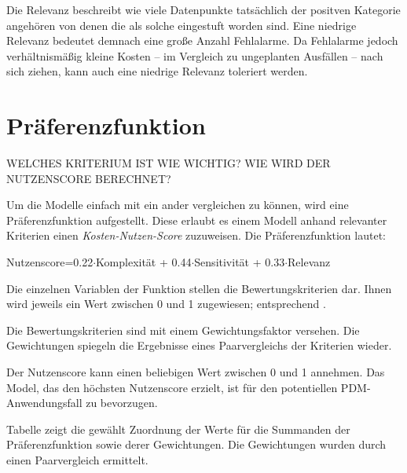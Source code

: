 Die Relevanz beschreibt wie viele Datenpunkte tatsächlich der positven Kategorie angehören von denen die als solche eingestuft worden sind. Eine niedrige Relevanz bedeutet demnach eine große Anzahl Fehlalarme. Da Fehlalarme jedoch verhältnismäßig kleine Kosten -- im Vergleich zu ungeplanten Ausfällen -- nach sich ziehen, kann auch eine niedrige Relevanz toleriert werden.


\section{Präferenzfunktion}
\label{sec:praeferenzfunktion}
WELCHES KRITERIUM IST WIE WICHTIG? WIE WIRD DER NUTZENSCORE BERECHNET?

Um die Modelle einfach mit ein ander vergleichen zu können, wird eine Präferenzfunktion aufgestellt. Diese erlaubt es einem Modell anhand relevanter Kriterien einen \textit{Kosten-Nutzen-Score} zuzuweisen. Die Präferenzfunktion lautet:
\begin{center}
    Nutzenscore=\num{0,22}$\cdot$Komplexität + \num{0,44}$\cdot$Sensitivität + \num{0,33}$\cdot$Relevanz
\end{center}

Die einzelnen Variablen der Funktion stellen die Bewertungskriterien dar. Ihnen wird jeweils ein Wert zwischen 0 und 1 zugewiesen; entsprechend .

Die Bewertungskriterien sind mit einem Gewichtungsfaktor versehen. Die Gewichtungen spiegeln die Ergebnisse eines Paarvergleichs der Kriterien wieder. 

Der Nutzenscore kann einen beliebigen Wert zwischen 0 und 1 annehmen. Das Model, das den höchsten Nutzenscore erzielt, ist für den potentiellen PDM-Anwendungsfall zu bevorzugen.

Tabelle  zeigt die gewählt Zuordnung der Werte für die Summanden der Präferenzfunktion sowie derer Gewichtungen. Die Gewichtungen wurden durch einen Paarvergleich ermittelt.

